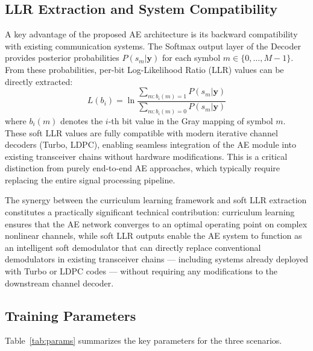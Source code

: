 \documentclass{JECnew}
\begin{document}
{\color{blue}\subsection{LLR Extraction and System Compatibility}

A key advantage of the proposed AE architecture is its backward compatibility with existing communication systems. The Softmax output layer of the Decoder provides posterior probabilities $P(s_m | \mathbf{y})$ for each symbol $m \in \{0, \ldots, M-1\}$. From these probabilities, per-bit Log-Likelihood Ratio (LLR) values can be directly extracted:
\begin{equation}
L(b_i) = \ln \frac{\sum_{m: b_i(m)=1} P(s_m | \mathbf{y})}{\sum_{m: b_i(m)=0} P(s_m | \mathbf{y})}
\end{equation}
where $b_i(m)$ denotes the $i$-th bit value in the Gray mapping of symbol $m$. These soft LLR values are fully compatible with modern iterative channel decoders (Turbo, LDPC), enabling seamless integration of the AE module into existing transceiver chains without hardware modifications. This is a critical distinction from purely end-to-end AE approaches, which typically require replacing the entire signal processing pipeline.

The synergy between the curriculum learning framework and soft LLR extraction constitutes a practically significant technical contribution: curriculum learning ensures that the AE network converges to an optimal operating point on complex nonlinear channels, while soft LLR outputs enable the AE system to function as an intelligent soft demodulator that can directly replace conventional demodulators in existing transceiver chains --- including systems already deployed with Turbo or LDPC codes --- without requiring any modifications to the downstream channel decoder.}

\subsection{Training Parameters}

Table~\ref{tab:params} summarizes the key parameters for the three scenarios.
\end{document}
